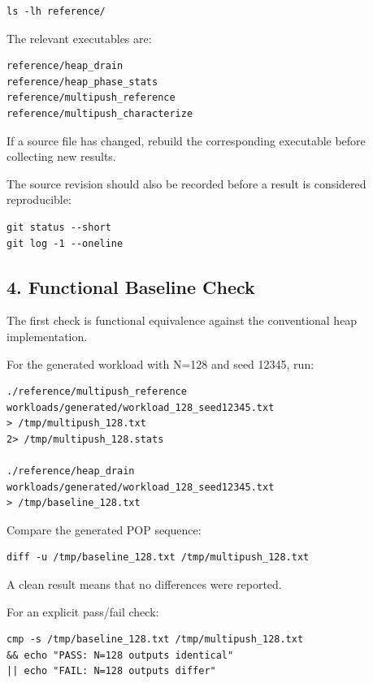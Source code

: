 \documentclass[11pt,a4paper]{article}
\begin{document}
\begin{lstlisting}
ls -lh reference/
\end{lstlisting}

The relevant executables are:

\begin{lstlisting}
reference/heap_drain
reference/heap_phase_stats
reference/multipush_reference
reference/multipush_characterize
\end{lstlisting}

If a source file has changed, rebuild the corresponding executable before
collecting new results.

The source revision should also be recorded before a result is considered
reproducible:

\begin{lstlisting}
git status --short
git log -1 --oneline
\end{lstlisting}

\subsection{4. Functional Baseline Check}

The first check is functional equivalence against the conventional heap
implementation.

For the generated workload with N=128 and seed 12345, run:

\begin{lstlisting}
./reference/multipush_reference
workloads/generated/workload_128_seed12345.txt
> /tmp/multipush_128.txt
2> /tmp/multipush_128.stats

./reference/heap_drain
workloads/generated/workload_128_seed12345.txt
> /tmp/baseline_128.txt
\end{lstlisting}

Compare the generated POP sequence:

\begin{lstlisting}
diff -u /tmp/baseline_128.txt /tmp/multipush_128.txt
\end{lstlisting}

A clean result means that no differences were reported.

For an explicit pass/fail check:

\begin{lstlisting}
cmp -s /tmp/baseline_128.txt /tmp/multipush_128.txt
&& echo "PASS: N=128 outputs identical"
|| echo "FAIL: N=128 outputs differ"
\end{lstlisting}
\end{document}

